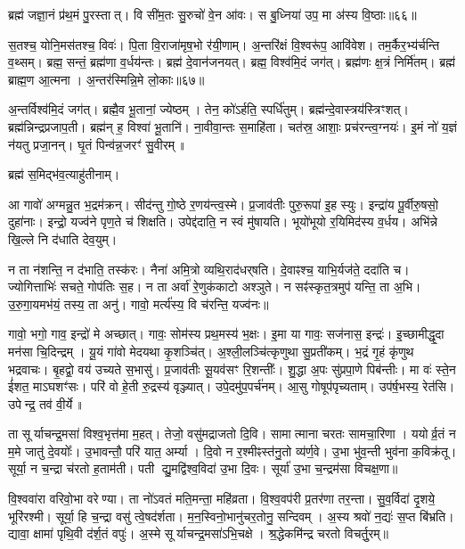 ब्रह्म॑ जज्ञा॒नं प्र॑थ॒मं पु॒रस्तात्।
वि सी॑म॒तः सु॒रुचो॑ वे॒न आ॑वः।
स बु॒ध्निया॑ उप॒ मा अ॑स्य वि॒ष्ठाः॥६६॥

स॒तश्च॒ योनि॒मस॑तश्च॒ विवः॑।
पि॒ता वि॒राजा॑मृष॒भो र॑यी॒णाम्।
अ॒न्तरि॑क्षं वि॒श्वरू॑प॒ आवि॑वेश।
तम॒र्कैर॒भ्य॑र्चन्ति व॒थ्सम्।
ब्रह्म॒ सन्तं॒ ब्रह्म॑णा व॒र्धय॑न्तः।
ब्रह्म॑ दे॒वान॑जनयत्।
ब्रह्म॒ विश्व॑मि॒दं जग॑त्।
ब्रह्म॑णः क्ष॒त्रं निर्मि॑तम्।
ब्रह्म॑ ब्राह्म॒ण आ॒त्मना।
अ॒न्तर॑स्मिन्नि॒मे लो॒काः॥६७॥

अ॒न्तर्विश्व॑मि॒दं जग॑त्।
ब्रह्मै॒व भू॒तानां॒ ज्येष्ठम्।
तेन॒ को॑ऽर्\mbox{}हति॒ स्पर्धि॑तुम्।
ब्रह्म॑न्दे॒वास्त्रय॑स्त्रिꣳशत्।
ब्रह्म॑न्निन्द्रप्रजाप॒ती।
ब्रह्म॑न् ह॒ विश्वा॑ भू॒तानि॑।
ना॒वीवा॒न्तः स॒माहि॑ता।
चत॑स्र॒ आशाः॒ प्रच॑रन्त्व॒ग्नयः॑।
इ॒मं नो॑ य॒ज्ञं न॑यतु प्रजा॒नन्।
घृ॒तं पिन्व॑न्न॒जरꣳ॑ सु॒वीरम्॥

ब्रह्म॑ स॒मिद्भ॑व॒त्याहु॑तीनाम्।

आ गावो॑ अग्मन्नु॒त भ॒द्रम॑क्रन्।
सीद॑न्तु गो॒ष्ठे र॒णय॑न्त्व॒स्मे।
प्र॒जाव॑तीः पुरु॒रूपा॑ इ॒ह स्युः।
इन्द्रा॑य पू॒र्वीरु॒षसो॒ दुहा॑नाः।
इन्द्रो॒ यज्व॑ने पृण॒ते च॑ शिक्षति।
उपेद्द॑दाति॒ न स्वं मु॑षायति।
भूयो॑भूयो र॒यिमिद॑स्य व॒र्धय\sn{}।
अभि॑न्ने खि॒ल्ले नि द॑धाति देव॒युम्।

न ता न॑शन्ति॒ न द॑भाति॒ तस्क॑रः।
नैना॑ अमि॒त्रो व्यथि॒राद॑धर्‌षति।
दे॒वाꣴश्च॒ याभि॒र्यज॑ते॒ ददा॑ति च।
ज्योगित्ताभिः॑ सचते॒ गोप॑तिः स॒ह।
न ता अर्वा॑ रे॒णुक॑काटो अश्ञुते।
न सꣴ॑स्कृत॒त्रमुप॑ यन्ति॒ ता अ॒भि।
उ॒रु॒गा॒यमभ॑यं॒ तस्य॒ ता अनु॑।
गावो॒ मर्त्य॑स्य॒ वि च॑रन्ति॒ यज्व॑नः॥

गावो॒ भगो॒ गाव॒ इन्द्रो॑ मे अच्छात्।
गावः॒ सोम॑स्य प्रथ॒मस्य॑ भ॒क्षः।
इ॒मा या गावः॒ सज॑नास॒ इन्द्रः॑।
इ॒च्छामीद्धृ॒दा मन॑सा चि॒दिन्द्रम्।
यू॒यं गा॑वो मेदयथा कृ॒शञ्चि॑त्।
अ॒श्ली॒लञ्चि॑त्कृणुथा सु॒प्रती॑कम्।
भ॒द्रं गृ॒हं कृ॑णुथ भद्रवाचः।
बृ॒हद्वो॒ वय॑ उच्यते स॒भासु॑।
प्र॒जाव॑तीः सू॒यव॑सꣳ रि॒शन्तीः᳚।
शु॒द्धा अ॒पः सु॑प्रपा॒णे पिब॑न्तीः।
मा वः॑ स्ते॒न ई॑शत॒ माऽघशꣳ॑सः।
परि॑ वो हे॒ती रु॒द्रस्य॑ वृञ्ज्यात्।
उपे॒दमु॑प॒पर्च॑नम्।
आ॒सु गोषूप॑पृच्यताम्।
उप॑र्\mbox{}ष॒भस्य॒ रेत॑सि।
उपेन्द्र॒ तव॑ वी॒र्ये॥

ता सूर्याचन्द्र॒मसा॑ विश्व॒भृत्त॑मा म॒हत्।
तेजो॒ वसु॑मद्राजतो दि॒वि।
सामात्माना चरतः सामचा॒रिणा।
ययोर्व्र॒तं न म॒मे जातु॑ दे॒वयोः᳚।
उ॒भावन्तौ॒ परि॑ यात॒ अर्म्या।
दि॒वो न र॒श्मीꣴस्त॑नु॒तो व्य॑र्ण॒वे।
उ॒भा भु॑व॒न्ती भुव॑ना क॒विक्र॑तू।
सूर्या॒ न च॒न्द्रा च॑रतो ह॒ताम॑ती।
पती द्यु॒मद्वि॑श्व॒विदा॑ उ॒भा दि॒वः।
सूर्या॑ उ॒भा च॒न्द्रम॑सा विचक्ष॒णा॥

वि॒श्ववा॑रा वरिवो॒भा वरेण्या।
ता नो॑ऽवतं मति॒मन्ता॒ महि॑व्रता।
वि॒श्व॒वप॑री प्र॒तर॑णा तर॒न्ता।
सु॒व॒र्विदा॑ दृ॒शये॒ भूरि॑रश्मी।
सूर्या॒ हि च॒न्द्रा वसु॑ त्वे॒षद॑र्\mbox{}शता।
म॒न॒स्विनो॒भानु॑चर॒तोनु॒ सन्दिवम्।
अ॒स्य श्रवो॑ न॒द्यः॑ स॒प्त बि॑भ्रति।
द्यावा॒ क्षामा॑ पृथि॒वी द॑र्\mbox{}श॒तं वपुः॑।
अ॒स्मे सूर्याचन्द्र॒मसा॑ऽभि॒चक्षे।
श्र॒द्धेकमि॑न्द्र चरतो विचर्तु॒रम्॥

